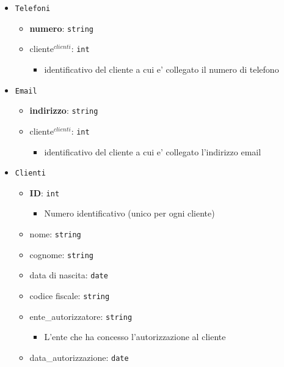 \documentclass[]{article}
\providecommand{\tightlist}{%
  \setlength{\itemsep}{0pt}\setlength{\parskip}{0pt}}
\begin{document}
\begin{itemize}
\item
  \texttt{Telefoni}

  \begin{itemize}
  \tightlist
  \item
    \textbf{numero}: \texttt{string}
  \item
    cliente\(^{clienti}\): \texttt{int}

    \begin{itemize}
    \tightlist
    \item
      identificativo del cliente a cui e' collegato il numero di
      telefono
    \end{itemize}
  \end{itemize}
\item
  \texttt{Email}

  \begin{itemize}
  \tightlist
  \item
    \textbf{indirizzo}: \texttt{string}
  \item
    cliente\(^{clienti}\): \texttt{int}

    \begin{itemize}
    \tightlist
    \item
      identificativo del cliente a cui e' collegato l'indirizzo email
    \end{itemize}
  \end{itemize}
\item
  \texttt{Clienti}

  \begin{itemize}
  \tightlist
  \item
    \textbf{ID}: \texttt{int}

    \begin{itemize}
    \tightlist
    \item
      Numero identificativo (unico per ogni cliente)
    \end{itemize}
  \item
    nome: \texttt{string}
  \item
    cognome: \texttt{string}
  \item
    data di nascita: \texttt{date}
  \item
    codice fiscale: \texttt{string}
  \item
    ente\_autorizzatore: \texttt{string}

    \begin{itemize}
    \tightlist
    \item
      L'ente che ha concesso l'autorizzazione al cliente
    \end{itemize}
  \item
    data\_autorizzazione: \texttt{date}


\end{itemize}
\end{itemize}
\end{document}
